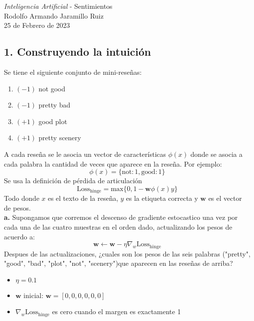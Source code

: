 \documentclass[14pt,a4paper]{report}
\begin{document}
\newcommand{\commentedbox}[2]{%
  \mbox{
    \begin{tabular}[t]{@{}c@{}}
    $\boxed{\displaystyle#1}$\\
    #2
    \end{tabular}%
  }%
}
\pagestyle{fancy}
\Large{\textit{Inteligencia Artificial} - Sentimientos}\\
\normalsize
Rodolfo Armando Jaramillo Ruiz\\
25 de Febrero de 2023\\
\subsection*{1. Construyendo la intuición}
\quad Se tiene el siguiente conjunto de mini-reseñas:
\begin{enumerate}
	\item $(-1)$ not good
	\item $(-1)$ pretty bad
	\item $(+1)$ good plot
	\item $(+1)$ pretty scenery
\end{enumerate}
A cada reseña se le asocia un vector de características $\phi(x)$ donde se asocia a cada palabra la cantidad de veces que aparece en la reseña. Por ejemplo:\\
\begin{equation*}
	\phi(x)=\{\text{not}:1,\text{good}:1\}
\end{equation*} 
Se usa la definición de pérdida de articulación
\begin{equation*}
	\text{Loss}_{\text{hinge}}=\text{max}\{0,1-\bm{w}\phi(x)y\}
\end{equation*}
Todo donde $x$ es el texto de la reseña, $y$ es la etiqueta correcta y $\bm{w}$ es el vector de pesos.\\
\textbf{a.} Supongamos que corremos el descenso de gradiente estocastico una vez por cada una de las cuatro muestras en el orden dado, actualizando los pesos de acuerdo a:
\begin{equation*}
	\mathbf{w}\leftarrow\mathbf{w}-\eta\nabla_{w}\text{Loss}_{\text{hinge}}
\end{equation*}
Despues de las actualizaciones, ¿cuales son los pesos de las seis palabras ("pretty",
"good", "bad", "plot", "not", "scenery")que aparecen en las reseñas de arriba?\\
\begin{itemize}
	\item $\eta=0.1$
	\item $\mathbf{w}$ inicial: $\mathbf{w}=[0,0,0,0,0,0]$
	\item $\nabla_{w}\text{Loss}_{\text{hinge}}$ es cero cuando el margen es exactamente 1
\end{itemize}
\end{document}
